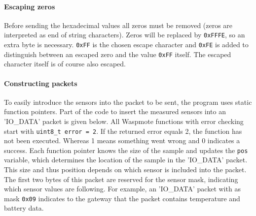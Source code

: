 \paragraph{Escaping zeros}
Before sending the hexadecimal values all zeros must be removed (zeros are interpreted as end of string characters). Zeros will be replaced by \verb+0xFFFE+, so an extra byte is necessary. \verb+0xFF+ is the chosen escape character and \verb+0xFE+ is added to distinguish between an escaped zero and the value \verb+0xFF+ itself. The escaped character itself is of course also escaped.
\paragraph{Constructing packets}
To easily introduce the sensors into the packet to be sent, the program uses static function pointers. Part of the code to insert the measured sensors into an 'IO\_DATA' packet is given below. All Waspmote functions with error checking start with \verb+uint8_t error = 2+. If the returned error equals 2, the function has not been executed. Whereas 1 means something went wrong and 0 indicates a success. Each function pointer knows the size of the sample and updates the \verb+pos+ variable, which determines the location of the sample in the 'IO\_DATA' packet. This size and thus position depends on which sensor is included into the packet. The first two bytes of this packet are reserved for the sensor mask, indicating which sensor values are following. For example, an 'IO\_DATA' packet with as mask \verb+0x09+ indicates to the gateway that the packet contains temperature and battery data.
